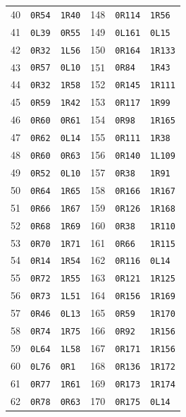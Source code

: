 \begin{longtable}{rll@{\hspace{18mm}}rll}
40 & \texttt{0R54} & \texttt{1R40} & 148 & \texttt{0R114} & \texttt{1R56} \\
41 & \texttt{0L39} & \texttt{0R55} & 149 & \texttt{0L161} & \texttt{0L15} \\
42 & \texttt{0R32} & \texttt{1L56} & 150 & \texttt{0R164} & \texttt{1R133} \\
43 & \texttt{0R57} & \texttt{0L10} & 151 & \texttt{0R84} & \texttt{1R43} \\
44 & \texttt{0R32} & \texttt{1R58} & 152 & \texttt{0R145} & \texttt{1R111} \\
45 & \texttt{0R59} & \texttt{1R42} & 153 & \texttt{0R117} & \texttt{1R99} \\
46 & \texttt{0R60} & \texttt{0R61} & 154 & \texttt{0R98} & \texttt{1R165} \\
47 & \texttt{0R62} & \texttt{0L14} & 155 & \texttt{0R111} & \texttt{1R38} \\
48 & \texttt{0R60} & \texttt{0R63} & 156 & \texttt{0R140} & \texttt{1L109} \\
49 & \texttt{0R52} & \texttt{0L10} & 157 & \texttt{0R38} & \texttt{1R91} \\
50 & \texttt{0R64} & \texttt{1R65} & 158 & \texttt{0R166} & \texttt{1R167} \\
51 & \texttt{0R66} & \texttt{1R67} & 159 & \texttt{0R126} & \texttt{1R168} \\
52 & \texttt{0R68} & \texttt{1R69} & 160 & \texttt{0R38} & \texttt{1R110} \\
53 & \texttt{0R70} & \texttt{1R71} & 161 & \texttt{0R66} & \texttt{1R115} \\
54 & \texttt{0R14} & \texttt{1R54} & 162 & \texttt{0R116} & \texttt{0L14} \\
55 & \texttt{0R72} & \texttt{1R55} & 163 & \texttt{0R121} & \texttt{1R125} \\
56 & \texttt{0R73} & \texttt{1L51} & 164 & \texttt{0R156} & \texttt{1R169} \\
57 & \texttt{0R46} & \texttt{0L13} & 165 & \texttt{0R59} & \texttt{1R170} \\
58 & \texttt{0R74} & \texttt{1R75} & 166 & \texttt{0R92} & \texttt{1R156} \\
59 & \texttt{0L64} & \texttt{1L58} & 167 & \texttt{0R171} & \texttt{1R156} \\
60 & \texttt{0L76} & \texttt{0R1} & 168 & \texttt{0R136} & \texttt{1R172} \\
61 & \texttt{0R77} & \texttt{1R61} & 169 & \texttt{0R173} & \texttt{1R174} \\
62 & \texttt{0R78} & \texttt{0R63} & 170 & \texttt{0R175} & \texttt{0L14} \\

\end{longtable}
